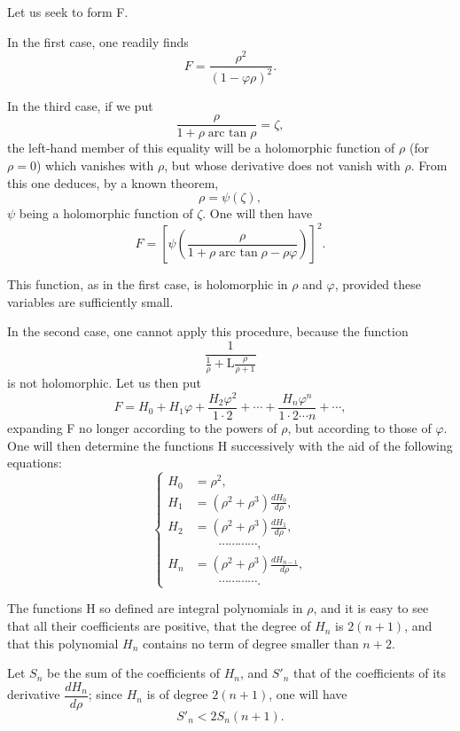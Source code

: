 \documentclass[11pt]{article}
\begin{document}
Let us seek to form F.

In the first case, one readily finds
\[
F=\frac{\rho^2}{(1-\varphi\rho)^2}.
\]

In the third case, if we put
\[
\frac{\rho}{1+\rho\operatorname{arc\ tan}\rho}=\zeta,
\]
the left-hand member of this equality will be a holomorphic function of $\rho$ (for $\rho=0$) which vanishes with $\rho$, but whose derivative does not vanish with $\rho$. From this one deduces, by a known theorem,
\[
\rho=\psi(\zeta),
\]
$\psi$ being a holomorphic function of $\zeta$. One will then have
\[
F=\left[\psi\left(\frac{\rho}{1+\rho\operatorname{arc\ tan}\rho-\rho\varphi}\right)\right]^2.
\]

This function, as in the first case, is holomorphic in $\rho$ and $\varphi$, provided these variables are sufficiently small.

In the second case, one cannot apply this procedure, because the function
\[
\frac{1}{\frac1\rho+\mathrm L\frac{\rho}{\rho+1}}
\]
is not holomorphic. Let us then put
\[
F=H_0+H_1\varphi+\frac{H_2\varphi^2}{1\cdot2}+\cdots+\frac{H_n\varphi^n}{1\cdot2\cdots n}+\cdots,
\]
expanding F no longer according to the powers of $\rho$, but according to those of $\varphi$. One will then determine the functions H successively with the aid of the following equations:
\begin{equation}\tag{1 ter}
\left\{
\begin{aligned}
H_0&=\rho^2,\\
H_1&=(\rho^2+\rho^3)\frac{dH_0}{d\rho},\\
H_2&=(\rho^2+\rho^3)\frac{dH_1}{d\rho},\\
&\hspace{2em}\cdots\cdots\cdots\cdots,\\
H_n&=(\rho^2+\rho^3)\frac{dH_{n-1}}{d\rho},\\
&\hspace{2em}\cdots\cdots\cdots\cdots.
\end{aligned}
\right.
\end{equation}

The functions H so defined are integral polynomials in $\rho$, and it is easy to see that all their coefficients are positive, that the degree of $H_n$ is $2(n+1)$, and that this polynomial $H_n$ contains no term of degree smaller than $n+2$.

Let $S_n$ be the sum of the coefficients of $H_n$, and $S'_n$ that of the coefficients of its derivative $\dfrac{dH_n}{d\rho}$; since $H_n$ is of degree $2(n+1)$, one will have
\[
S'_n<2S_n(n+1).
\]
\end{document}
